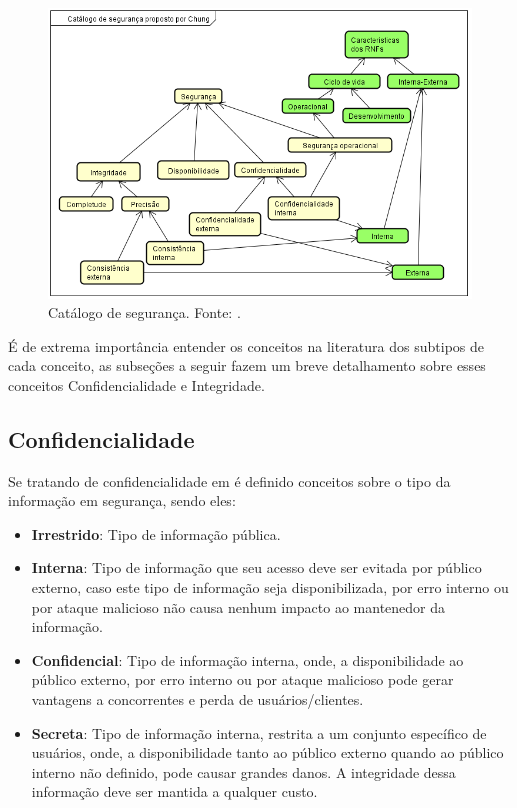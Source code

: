 \begin{figure}[h!]
	\centering
	\includegraphics[keepaspectratio=true,scale=0.9]{figuras/catalogoSegurancaChung.PNG}
	\caption{Catálogo de segurança. Fonte: \cite{chung2012non}.}
	\label{catalogoSegurancaChung}
\end{figure}

É de extrema importância entender os conceitos na literatura dos subtipos de cada conceito, as subseções a seguir fazem um breve detalhamento sobre esses conceitos Confidencialidade e Integridade. 

\subsection{Confidencialidade}
\label{subsec:confidencialidade}

Se tratando de confidencialidade em \cite{reis10classificaccao} é definido conceitos sobre o tipo da informação em segurança, sendo eles: 

\begin{itemize}
	\item \textbf{Irrestrido}: Tipo de informação pública. 
	
	\item \textbf{Interna}: Tipo de informação que seu acesso deve ser evitada por público externo, caso este tipo de informação seja disponibilizada, por erro interno ou por ataque malicioso não causa nenhum impacto ao mantenedor da informação.
	
	\item \textbf{Confidencial}: Tipo de informação interna, onde, a disponibilidade ao público externo, por erro interno ou por ataque malicioso pode gerar vantagens a concorrentes e perda de usuários/clientes. 
	
	\item \textbf{Secreta}: Tipo de informação interna, restrita a um conjunto específico de usuários, onde, a disponibilidade tanto ao público externo quando ao público interno não definido, pode causar grandes danos. A integridade dessa informação deve ser mantida a qualquer custo.
\end{itemize} 

